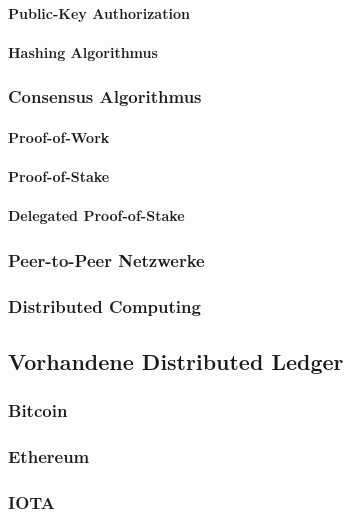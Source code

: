 \paragraph{Public-Key Authorization}

\paragraph{Hashing Algorithmus}

\subsubsection{Consensus Algorithmus}

\paragraph{Proof-of-Work}

\paragraph{Proof-of-Stake}

\paragraph{Delegated Proof-of-Stake}

\subsubsection{Peer-to-Peer Netzwerke}

\subsubsection{Distributed Computing}

\subsection{Vorhandene Distributed Ledger}

\subsubsection{Bitcoin}

\subsubsection{Ethereum}

\subsubsection{IOTA}

